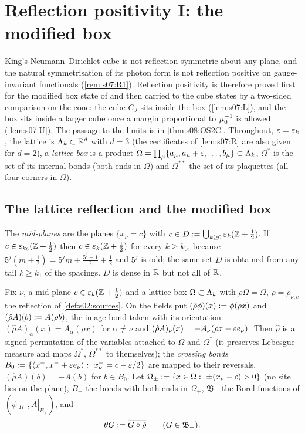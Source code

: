 \section{Reflection positivity I: the modified box}

King's Neumann--Dirichlet cube is not reflection symmetric about any plane, and the natural symmetrisation of its photon form is not reflection positive on gauge-invariant functionals (\cref{rem:s07:R1}). Reflection positivity is therefore proved first for the modified box state of \cite[(3.38)]{K2} and then carried to the cube states by a two-sided comparison on the cone: the cube $C_J$ sits inside the box (\cref{lem:s07:L}), and the box sits inside a larger cube once a margin proportional to $\mu_0^{-1}$ is allowed (\cref{lem:s07:U}). The passage to the limits is in \cref{thm:s08:OS2C}. Throughout, $\varepsilon=\varepsilon_k$, the lattice is $\Lambda_k\subset\mathbb R^d$ with $d=3$ (the certificates of \cref{lem:s07:R} are also given for $d=2$), a \emph{lattice box} is a product $\Omega=\prod_\mu\{a_\mu,a_\mu+\varepsilon,\dots,b_\mu\}\subset\Lambda_k$, $\Omega^*$ is the set of its internal bonds (both ends in $\Omega$) and $\Omega^{**}$ the set of its plaquettes (all four corners in $\Omega$).

\subsection{The lattice reflection and the modified box}

\begin{definition}\label{def:s07:reflection}
The \emph{mid-planes} are the planes $\{x_\nu=c\}$ with $c\in D:=\bigcup_{k\ge0}\varepsilon_k(\mathbb Z+\frac12)$. If $c\in\varepsilon_{k_0}(\mathbb Z+\frac12)$ then $c\in\varepsilon_k(\mathbb Z+\frac12)$ for every $k\ge k_0$, because $5^j(m+\frac12)=5^jm+\frac{5^j-1}2+\frac12$ and $5^j$ is odd; the same set $D$ is obtained from any tail $k\ge k_1$ of the spacings. $D$ is dense in $\mathbb R$ but not all of $\mathbb R$.

Fix $\nu$, a mid-plane $c\in\varepsilon_k(\mathbb Z+\frac12)$ and a lattice box $\Omega\subset\Lambda_k$ with $\rho\Omega=\Omega$, $\rho=\rho_{\nu,c}$ the reflection of \cref{def:s02:sources}. On the fields put $(\hat\rho\phi)(x):=\phi(\rho x)$ and $(\hat\rho A)(b):= A(\rho b)$, the image bond taken with its orientation: $(\hat\rho A)_\alpha(x)=A_\alpha(\rho x)$ for $\alpha\ne\nu$ and $(\hat\rho A)_\nu(x)=-A_\nu(\rho x-\varepsilon e_\nu)$. Then $\hat\rho$ is a signed permutation of the variables attached to $\Omega$ and $\Omega^*$ (it preserves Lebesgue measure and maps $\Omega^*$, $\Omega^{**}$ to themselves); the \emph{crossing bonds} $B_0\defeq\{\langle x^-,x^-+\eps e_\nu\rangle:\ x^-_\nu=c-\eps/2\}$ are mapped to their reversals, $(\hat\rho A)(b)=-A(b)$ for $b\in B_0$. Let $\Omega_\pm\defeq\{x\in\Omega:\ \pm(x_\nu-c)>0\}$ (no site lies on the plane), $B_+$ the bonds with both ends in $\Omega_+$, $\mathfrak B_+$ the Borel functions of $(\phi|_{\Omega_+},A|_{B_+})$, and
\[
\theta G:=\overline{G\circ\hat\rho}\qquad(G\in\mathfrak B_+).
\]
\end{definition}

